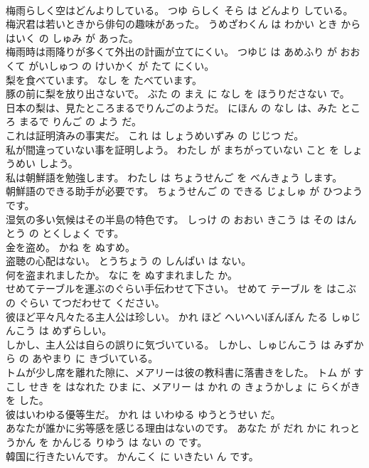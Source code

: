 \documentclass[8pt]{extreport}
\begin{document}
\begin{CJK}{UTF8}{min}
\\	梅雨らしく空はどんよりしている。	つゆ らしく そら は どんより している。	
\\	梅沢君は若いときから俳句の趣味があった。	うめざわくん は わかい とき から はいく の しゅみ が あった。	
\\	梅雨時は雨降りが多くて外出の計画が立てにくい。	つゆじ は あめふり が おおくて がいしゅつ の けいかく が たて にくい。	
\\	梨を食べています。	なし を たべています。	
\\	豚の前に梨を放り出さないで。	ぶた の まえ に なし を ほうりださない で。	
\\	日本の梨は、見たところまるでりんごのようだ。	にほん の なし は、みた ところ まるで りんご の よう だ。	
\\	これは証明済みの事実だ。	これ は しょうめいずみ の じじつ だ。	
\\	私が間違っていない事を証明しよう。	わたし が まちがっていない こと を しょうめい しよう。	
\\	私は朝鮮語を勉強します。	わたし は ちょうせんご を べんきょう します。	
\\	朝鮮語のできる助手が必要です。	ちょうせんご の できる じょしゅ が ひつよう です。	
\\	湿気の多い気候はその半島の特色です。	しっけ の おおい きこう は その はんとう の とくしょく です。	
\\	金を盗め。	かね を ぬすめ。	
\\	盗聴の心配はない。	とうちょう の しんぱい は ない。	
\\	何を盗まれましたか。	なに を ぬすまれました か。	
\\	せめてテーブルを運ぶのぐらい手伝わせて下さい。	せめて テーブル を はこぶ の ぐらい てつだわせて ください。	
\\	彼ほど平々凡々たる主人公は珍しい。	かれ ほど へいへいぼんぼん たる しゅじんこう は めずらしい。	
\\	しかし、主人公は自らの誤りに気づいている。	しかし、しゅじんこう は みずから の あやまり に きづいている。	
\\	トムが少し席を離れた隙に、メアリーは彼の教科書に落書きをした。	トム が すこし せき を はなれた ひま に、メアリー は かれ の きょうかしょ に らくがき を した。	
\\	彼はいわゆる優等生だ。	かれ は いわゆる ゆうとうせい だ。	
\\	あなたが誰かに劣等感を感じる理由はないのです。	あなた が だれ かに れっとうかん を かんじる りゆう は ない の です。	
\\	韓国に行きたいんです。	かんこく に いきたい ん です。	

\end{CJK}
\end{document}

